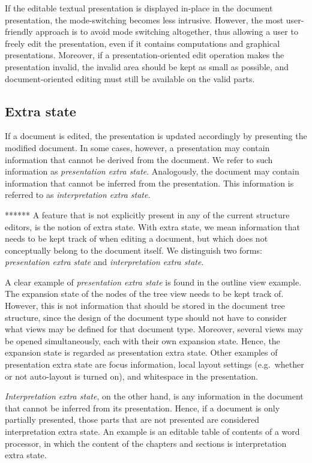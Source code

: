 If the editable textual presentation is displayed in-place in the document presentation, the mode-switching becomes less intrusive. However, the most user-friendly approach is to avoid mode switching altogether, thus allowing a user to freely edit the presentation, even if it contains computations and graphical presentations. Moreover, if a presentation-oriented edit operation makes the presentation invalid, the invalid area should be kept as small as possible, and document-oriented editing must still be available on the valid parts.


%																
\subsection{Extra state} \label{sect:editingExtraState}

If a document is edited, the presentation is updated accordingly by presenting the modified document. In some cases, however, a presentation may contain information that cannot be derived from the document. We refer to such information as {\em presentation extra state}. Analogously, the document may contain information that cannot be inferred from the presentation. This information is referred to as {\em interpretation extra state}. 

\bc *******
A feature that is not explicitly present in any of the current structure editors, is the notion of extra state. With extra state, we mean information that needs to be kept track of when editing a document, but which does not conceptually belong to the document itself.  We distinguish two forms: {\em presentation extra state} and {\em interpretation extra state}.
\ec

A clear example of {\em presentation extra state} is found in the outline view example. The expansion state of the nodes of the tree view needs to be kept track of. However, this is not information that should be stored in the document tree structure, since the design of the document type should not have to consider what views may be defined for that document type. Moreover, several views may be opened simultaneously, each with their own expansion state. Hence, the expansion state is regarded as presentation extra state. Other examples of presentation extra state are focus information, local layout settings (e.g.\ whether or not auto-layout is turned on), and whitespace in the presentation. 

{\em Interpretation extra state}, on the other hand, is any information in the document that cannot be inferred from its presentation. Hence, if a document is only partially presented, those parts that are not presented are considered interpretation extra state. An example is an editable table of contents of a word processor, in which the content of the chapters and sections is interpretation extra state.

